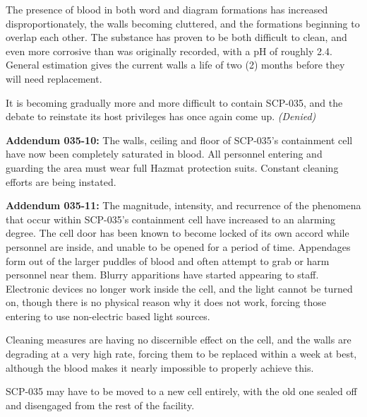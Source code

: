 The presence of blood in both word and diagram formations has increased disproportionately, the walls becoming cluttered, and the formations beginning to overlap each other. The substance has proven to be both difficult to clean, and even more corrosive than was originally recorded, with a pH of roughly 2.4. General estimation gives the current walls a life of two (2) months before they will need replacement.

It is becoming gradually more and more difficult to contain SCP-035, and the debate to reinstate its host privileges has once again come up. \textsl{(Denied)}

\textbf{Addendum 035-10:} The walls, ceiling and floor of SCP-035's containment cell have now been completely saturated in blood. All personnel entering and guarding the area must wear full Hazmat protection suits. Constant cleaning efforts are being instated.

\textbf{Addendum 035-11:} The magnitude, intensity, and recurrence of the phenomena that occur within SCP-035's containment cell have increased to an alarming degree. The cell door has been known to become locked of its own accord while personnel are inside, and unable to be opened for a period of time. Appendages form out of the larger puddles of blood and often attempt to grab or harm personnel near them. Blurry apparitions have started appearing to staff. Electronic devices no longer work inside the cell, and the light cannot be turned on, though there is no physical reason why it does not work, forcing those entering to use non-electric based light sources.

Cleaning measures are having no discernible effect on the cell, and the walls are degrading at a very high rate, forcing them to be replaced within a week at best, although the blood makes it nearly impossible to properly achieve this.

SCP-035 may have to be moved to a new cell entirely, with the old one sealed off and disengaged from the rest of the facility.